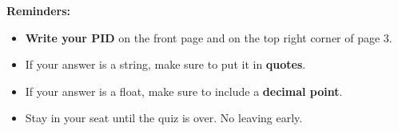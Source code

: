 \documentclass[twoside,12pt]{article}
\begin{document}
\begin{probset}
\begin{prob}
    \smallskip
    
    
    \smallskip
    
    
    \smallskip

    
    \smallskip
    
    
    \smallskip

\end{prob}


\end{probset}


\newpage

\begin{center}
\textbf{Reminders:}
\begin{itemize}
    \item \textbf{Write your PID} on the front page and on the top right corner of page 3.
    \item If your answer is a string, make sure to put it in \textbf{quotes}.
    \item If your answer is a float, make sure to include a \textbf{decimal point}.
    \item Stay in your seat until the quiz is over. No leaving early.
\end{itemize}
\end{center}
\end{document}
